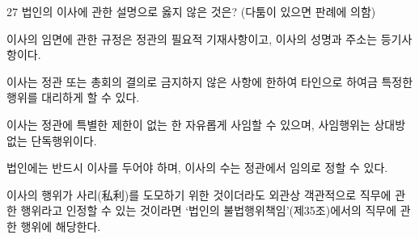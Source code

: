 \begin{question}{27}
법인의 이사에 관한 설명으로 옳지 않은 것은? (다툼이 있으면 판례에 의함)
\begin{choices}
  \item 이사의 임면에 관한 규정은 정관의 필요적 기재사항이고, 이사의 성명과 주소는 등기사항이다.
  \item 이사는 정관 또는 총회의 결의로 금지하지 않은 사항에 한하여 타인으로 하여금 특정한 행위를 대리하게 할 수 있다.
  \item 이사는 정관에 특별한 제한이 없는 한 자유롭게 사임할 수 있으며, 사임행위는 상대방 없는 단독행위이다.
  \item 법인에는 반드시 이사를 두어야 하며, 이사의 수는 정관에서 임의로 정할 수 있다.
  \item 이사의 행위가 사리(私利)를 도모하기 위한 것이더라도 외관상 객관적으로 직무에 관한 행위라고 인정할 수 있는 것이라면 ‘법인의 불법행위책임’(제35조)에서의 직무에 관한 행위에 해당한다.
\end{choices}
\end{question}

